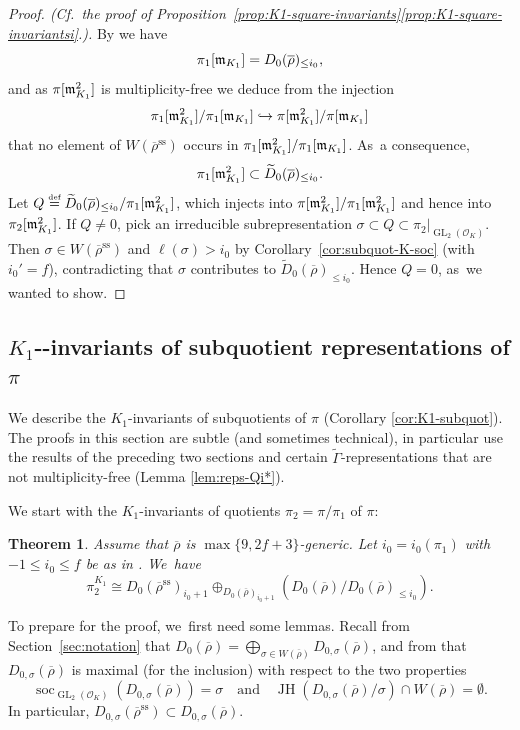 \documentclass[JEP,XML,SOM,Unicode,NoFloatCountersInSection, NoEqCountersInSection,published]{cedram}
\newcommand\hto{\mathrel{\lhook\joinrel\to}}
\newcommand{\quand}{\quad\text{and}\quad}
\let\wt\widetilde
\newcommand{\defeq}{\stackrel{\textrm{\tiny{\upshape{def}}}}{=}}
\newcommand{\cO}{\mathcal{O}}
\renewcommand{\ss}{\mathrm{ss}}
\newcommand{\rhobar}{\overline{\rho}}
\newcommand{\brho}{\overline{\rho}}
\DeclareMathOperator{\GL}{GL}
\DeclareMathOperator{\JH}{\mathrm{JH}}
\DeclareMathOperator{\soc}{soc}
\theoremstyle{plain}
\newtheorem{thm}[prop]{Theorem}
\theoremstyle{definition}
\begin{document}
\begin{proof}[Proof. (Cf.\ the proof of Proposition~\ref{prop:K1-square-invariants}\eqref{prop:K1-square-invariantsi}.)]
By \cite[Th.\,4.3.15]{BHHMS4} we have
\[
\pi_1[\m_{K_1}] = D_0(\brho)_{\le i_0},
\]
and as $\pi[\mathfrak{m}_{K_1}^2]$ is multiplicity-free we deduce from the injection
\[
\pi_1[\m_{K_1}^2]/\pi_1[\m_{K_1}]\hto \pi[\m_{K_1}^2]/\pi[\m_{K_1}]
\]
that no element of $W(\brho^\ss)$ occurs in $\pi_1[\mathfrak{m}_{K_1}^2]/\pi_1[\mathfrak{m}_{K_1}]$. As~a consequence,
\begin{equation*}
\pi_1[\m_{K_1}^2] \subset \wt{D}_0(\brho)_{\le i_0}.
\end{equation*}
Let $Q \defeq \wt{D}_0(\brho)_{\le i_0}/\pi_1[\m_{K_1}^2]$, which injects into $\pi[\mathfrak{m}_{K_1}^2]/\pi_1[\mathfrak{m}_{K_1}^2]$ and hence into $\pi_2[\mathfrak{m}_{K_1}^2]$.
If $Q \ne 0$, pick an irreducible subrepresentation $\sigma \subset Q \subset \pi_2|_{\GL_2(\cO_K)}$.
Then $\sigma \in W(\brho^\ss)$ and $\ell(\sigma) > i_0$ by Corollary~\ref{cor:subquot-K-soc} (with $i_0' = f$), contradicting that $\sigma$ contributes to $\wt{D}_0(\brho)_{\le i_0}$.
Hence $Q = 0$, as~we wanted to show.
\end{proof}

\subsection{\texorpdfstring{$K_1$-}{K\_1-}-invariants of subquotient representations of \texorpdfstring{$\pi$}{pi}}
\label{sec:k1-quotient}

We describe the $K_1$\nobreakdash-in\-vari\-ants of subquotients of $\pi$ (Corollary \ref{cor:K1-subquot}). The proofs in this section are subtle (and sometimes technical), in particular use the results of the preceding two sections and certain $\wt{\Gamma}$-representations that are not multiplicity-free (Lemma \ref{lem:reps-Qi*}).

We start with the $K_1$-invariants of quotients $\pi_2 = \pi/\pi_1$ of $\pi$:

\begin{thm}\label{thm:pi2-K1}
{Assume that $\brho$ is $\max\{9,2f+3\}$-generic.}
Let $i_0 = i_0(\pi_1)$ with $-1 \le i_0 \le f$ be as in \cite[Th.\,4.3.15]{BHHMS4}. We~have
\begin{equation*}
\pi_2^{K_1} \cong D_0(\brho^\ss)_{i_0+1} \oplus_{D_0(\brho)_{i_0+1}} (D_0(\brho)/D_0(\brho)_{\le i_0}).
\end{equation*}
\end{thm}

To prepare for the proof, we~first need some lemmas. Recall from Section~\ref{sec:notation} that $D_0(\brho)=\bigoplus_{\sigma\in W(\rhobar)}D_{0,\sigma}(\brho)$, and from \cite[\S 13]{BP} that $D_{0,\sigma}(\brho)$ is maximal (for the inclusion) with respect to the two properties
\[
\soc_{\GL_2(\cO_K)}(D_{0,\sigma}(\brho))=\sigma\quand\JH(D_{0,\sigma}(\brho)/\sigma)\cap W(\brho)=\emptyset.
\]
In particular, $D_{0,\sigma}(\brho^{\ss})\subset D_{0,\sigma}(\brho)$.
\end{document}
